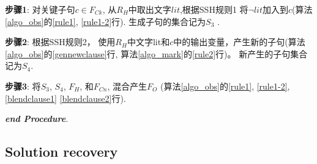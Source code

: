 \textbf{步骤1}:
对关键子句$c\in F_{Ck}$,
从$R_H$中取出文字$lit$,根据SSH规则1
将$\neg lit$加入到$c$(算法\ref{algo_obs}的\ref{rule1}, \ref{rule1-2}行).
生成子句的集合记为$S_3$ .

\textbf{步骤2}:
根据SSH规则2，
使用$R_H$中文字lit和$c$中的输出变量，产生新的子句(算法 \ref{algo_obs}的\ref{gennewclause}行,  算法\ref{algo_mark}的\ref{rule2}行)。
新产生的子句集合记为$S_4$.

\textbf{步骤3}:
将$S_3$, $S_4$, $F_H$, 和$F_{Cn}$, 混合产生$F_O$ (算法\ref{algo_obs}的\ref{rule1}, \ref{rule1-2}, \ref{blendclause1} \ref{blendclause2}行).

\textit{\textbf{end Procedure}}.
\subsection{Solution recovery}\label{mappping}
%
%


